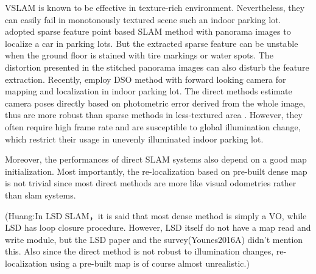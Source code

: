 \documentclass[journal]{IEEEtran}
\begin{document}
%

VSLAM is known to be effective in texture-rich environment\citep{ORB}.
Nevertheless, they can easily fail in monotonously textured scene such an indoor parking lot.
\citet{VW paking} adopted sparse feature point based SLAM method with panorama images to localize a car in parking lots.
But the extracted sparse feature can be unstable when the ground floor is stained with tire markings or water spots.
The distortion presented in the stitched panorama images can also disturb the feature extraction.
Recently, \citet{Engel2017Direct} employ DSO method with forward looking camera for mapping and localization in indoor parking lot.
The direct methods estimate camera poses directly based on photometric error derived from the whole image, thus are more robust than sparse methods in less-textured area \citep{Engel2014LSD} \citep{Forster2013SVO}.
However, they often require high frame rate and are susceptible to global illumination change, which restrict their usage in unevenly illuminated indoor parking lot\citep{Younes2016A}. 

Moreover, the performances of direct SLAM systems also depend on a good map initialization.\citep{Younes2016A}\citep{Horizon DSO}
Most importantly, the re-localization based on pre-built dense map is not trivial since most direct methods are more like visual odometries rather than slam systems\citep{Engel2014LSD}.


(Huang:In LSD SLAM，it is said that most dense method is simply a VO, while LSD has loop closure procedure. 
However, LSD itself do not have a map read and write module, but the LSD paper and the survey(Younes2016A) didn't mention this. Also since the direct method is not robust to illumination changes, re-localization using a pre-built map is of course almost unrealistic.)
\end{document}
